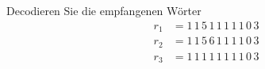 \begin{aufgabe}
Decodieren Sie die empfangenen Wörter
\begin{align*}
r_1 &= 1\,1\,5\,1\,1\,1\,1\,1\,0\,3\\
r_2 &= 1\,1\,5\,6\,1\,1\,1\,1\,0\,3\\
r_3 &= 1\,1\,1\,1\,1\,1\,1\,1\,0\,3
\end{align*}
\end{aufgabe}
